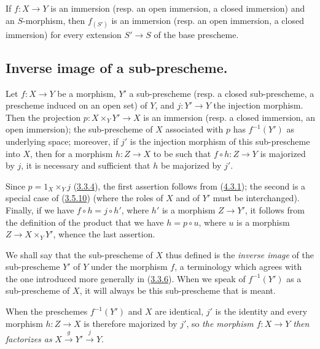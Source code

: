 \begin{corollary}[4.3.2]
\label{I.4.3.2}
If $f:X\to Y$ is an immersion (resp. an open immersion, a closed
immersion) and an $S$-morphism, then $f_{(S')}$ is an immersion (resp. an open
immersion, a closed immersion) for every extension $S'\to S$ of the base
prescheme.
\end{corollary}

\subsection{Inverse image of a sub-prescheme.}
\label{subsection:I.4.4}

\begin{proposition}[4.4.1]
\label{I.4.4.1}
Let $f:X\to Y$ be a morphism, $Y'$ a sub-prescheme (resp. a
closed sub-prescheme, a prescheme induced on an open set) of $Y$, and
$j:Y'\to Y$ the injection morphism. Then the projection $p:X\times_Y Y'\to X$
is an immersion (resp. a closed immersion, an open immersion); the
sub-prescheme of $X$ associated with $p$ has $f^{-1}(Y')$ as underlying space;
moreover, if $j'$ is the injection morphism of this sub-prescheme into $X$,
then for a morphism $h:Z\to X$ to be such that $f\circ h:Z\to Y$ is majorized
by $j$, it is necessary and sufficient that $h$ be majorized by $j'$.
\end{proposition}

Since $p=1_X\times_Y j$ (\hyperref[I.3.3.4]{3.3.4}), the first assertion
follows from (\hyperref[I.4.3.1]{4.3.1}); the second is a special case
of (\hyperref[I.3.5.10]{3.5.10}) (where the roles of $X$ and
of $Y'$ must be interchanged). Finally, if we have $f\circ h=j\circ h'$, where
$h'$ is a morphism $Z\to Y'$, it follows from the definition of the product
that we have $h=p\circ u$, where $u$ is a morphism $Z\to X\times_Y Y'$, whence
the last assertion.

We shall say that the sub-prescheme of $X$ thus defined is the \emph{inverse
image} of the sub-prescheme $Y'$ of $Y$ under the morphism $f$, a terminology
which agrees with the one introduced
more generally in (\hyperref[I.3.3.6]{3.3.6}). When we
speak of $f^{-1}(Y')$ as a sub-prescheme of $X$, it will always be
this sub-prescheme that is meant.

When the preschemes $f^{-1}(Y')$ and $X$ are identical, $j'$ is
the identity and every morphism $h:Z\to X$ is therefore majorized by $j'$, so
\emph{the morphism $f:X\to Y$ then factorizes as}
$X\xrightarrow{g}Y'\xrightarrow{j}Y$.

